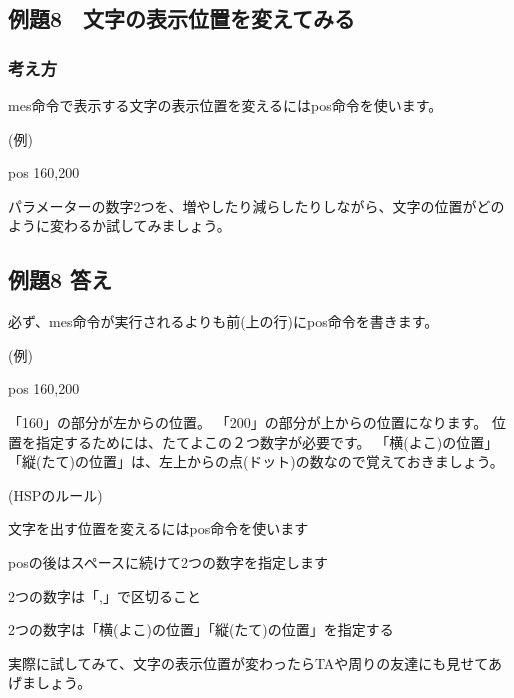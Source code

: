 \clearpage

\subsection{例題8　文字の表示位置を変えてみる}

\subsubsection*{考え方}

mes命令で表示する文字の表示位置を変えるにはpos命令を使います。

\begin{description}
    \item (例)
    \item pos 160,200
\end{description}

パラメーターの数字2つを、増やしたり減らしたりしながら、文字の位置がどのように変わるか試してみましょう。

\subsection*{例題8 答え}

必ず、mes命令が実行されるよりも前(上の行)にpos命令を書きます。

\begin{description}
    \item (例)
    \item pos 160,200
\end{description}

「160」の部分が左からの位置。
「200」の部分が上からの位置になります。
位置を指定するためには、たてよこの２つ数字が必要です。
「横(よこ)の位置」「縦(たて)の位置」は、左上からの点(ドット)の数なので覚えておきましょう。

\begin{description}
    \item (HSPのルール)
\end{description}

\begin{description}
    \item 文字を出す位置を変えるにはpos命令を使います
    \item posの後はスペースに続けて2つの数字を指定します
    \item 2つの数字は「,」で区切ること
    \item 2つの数字は「横(よこ)の位置」「縦(たて)の位置」を指定する
\end{description}

実際に試してみて、文字の表示位置が変わったらTAや周りの友達にも見せてあげましょう。